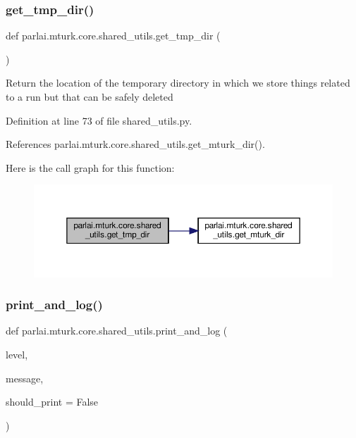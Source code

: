 \subsubsection{\texorpdfstring{get\+\_\+tmp\+\_\+dir()}{get\_tmp\_dir()}}
{\footnotesize\ttfamily def parlai.\+mturk.\+core.\+shared\+\_\+utils.\+get\+\_\+tmp\+\_\+dir (\begin{DoxyParamCaption}{ }\end{DoxyParamCaption})}

\begin{DoxyVerb}Return the location of the temporary directory in which we store
things related to a run but that can be safely deleted
\end{DoxyVerb}
 

Definition at line 73 of file shared\+\_\+utils.\+py.



References parlai.\+mturk.\+core.\+shared\+\_\+utils.\+get\+\_\+mturk\+\_\+dir().

Here is the call graph for this function\+:
\nopagebreak
\begin{figure}[H]
\begin{center}
\leavevmode
\includegraphics[width=350pt]{namespaceparlai_1_1mturk_1_1core_1_1shared__utils_aa0c7ddb9db866e2f19ec6a83112fc9d2_cgraph}
\end{center}
\end{figure}
\mbox{\label{namespaceparlai_1_1mturk_1_1core_1_1shared__utils_a9ffb0cdb3846323e276281cbeb16979a}} 
\subsubsection{\texorpdfstring{print\+\_\+and\+\_\+log()}{print\_and\_log()}}
{\footnotesize\ttfamily def parlai.\+mturk.\+core.\+shared\+\_\+utils.\+print\+\_\+and\+\_\+log (\begin{DoxyParamCaption}\item[{}]{level,  }\item[{}]{message,  }\item[{}]{should\+\_\+print = {\ttfamily False} }\end{DoxyParamCaption})}



